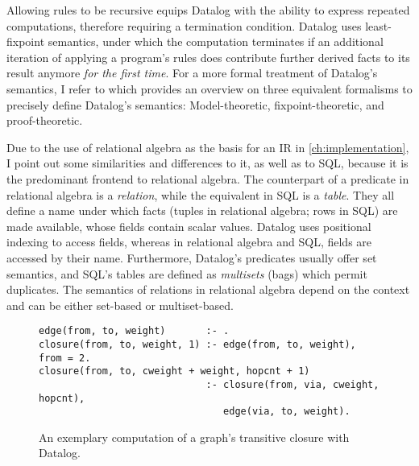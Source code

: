 Allowing rules to be recursive equips Datalog with the ability to express
repeated computations, therefore requiring a termination condition.
Datalog uses least-fixpoint semantics, under which the computation terminates
if an additional iteration of applying a program's rules does contribute further
derived facts to its result anymore \emph{for the first time}.
For a more formal treatment of Datalog's semantics, I refer to \cite{green2013datalog}
which provides an overview on three equivalent formalisms to precisely define
Datalog's semantics: Model-theoretic, fixpoint-theoretic, and proof-theoretic.

Due to the use of relational algebra as the basis for an \ac{IR}
in \ref{ch:implementation}, I point out some similarities and differences to it,
as well as to SQL, because it is the predominant frontend to relational algebra.
The counterpart of a predicate in relational algebra is a \emph{relation}, while
the equivalent in SQL is a \emph{table}.
They all define a name under which facts (tuples in relational algebra;
rows in SQL) are made available, whose fields contain scalar values.
Datalog uses positional indexing to access fields, whereas in
relational algebra and SQL, fields are accessed by their name.
Furthermore, Datalog's predicates usually offer set semantics,
and SQL's tables are defined as \emph{multisets} (bags) which permit duplicates.
The semantics of relations in relational algebra depend on the context and
can be either set-based or multiset-based.

\begin{figure}[htpb]
	\centering
	\begin{lstlisting}[keepspaces]
edge(from, to, weight)       :- .
closure(from, to, weight, 1) :- edge(from, to, weight), from = 2.
closure(from, to, cweight + weight, hopcnt + 1)
                             :- closure(from, via, cweight, hopcnt),
                                edge(via, to, weight).\end{lstlisting}
	\caption{An exemplary computation of a graph's transitive closure with Datalog.}\label{code:trans-closure-datalog}
\end{figure}

